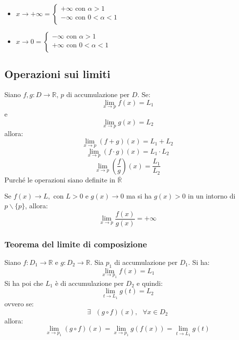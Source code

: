 \documentclass[a4paper,12pt, oneside]{book}
\begin{document}
\begin{shaded}
\begin{nota}
\begin{enumerate}
      \begin{itemize}
        \item $x\rightarrow +\infty=\left\{
          \begin{array}{ll} +\infty \mbox{ con } \alpha>1 \\ -\infty \mbox{ con
            } 0<\alpha<1 \\
          \end{array} \right.$
        \item $x\rightarrow 0=\left\{
          \begin{array}{ll} -\infty \mbox{ con } \alpha>1 \\ +\infty \mbox{ con
            } 0<\alpha<1 \\
          \end{array} \right.$
      \end{itemize}
    \end{enumerate}
  \end{nota}
\end{shaded}
\newpage
\subsection{Operazioni sui limiti}
\begin{teorema} Siano $f,g:D\rightarrow \mathbb{R}$,
  $p$ di accumulazione per $D$.  Se:
  $$\lim_{x\rightarrow p} f(x)=L_1$$
  e
  $$\lim_{x\rightarrow p} g(x)=L_2$$
  allora:
  $$\lim_{x\rightarrow p} (f+g)(x)=L_1+L_2$$
  $$\lim_{x\rightarrow p} (f\cdot g)(x)=L_1\cdot L_2$$
  $$\lim_{x\rightarrow p} \left(\frac{f}{g}\right)(x)=\frac{L_1}{L_2}$$
  Purché le operazioni siano definite in $\overline{\mathbb{R}}$
\end{teorema}
\begin{osservazione} Se $f(x)\rightarrow L, \mbox{ con } L>0$ e $
  g(x)\rightarrow 0$ ma si ha $g(x)>0$ in un intorno di $p\backslash\{p\}$,
  allora:
  $$\lim_{x\rightarrow p} \frac{f(x)}{g(x)}=+\infty$$
\end{osservazione}
\subsubsection{Teorema del limite di composizione}
\begin{teorema} Siano $f:D_1\rightarrow \mathbb{R}$
  e $g:D_2\rightarrow \mathbb{R}$. Sia $p_1$ di accumulazione per $D_1$. Si ha:
  $$\lim_{x\rightarrow p_1} f(x)=L_1$$
  Si ha poi che $L_1$ è di accumulazione per $D_2$ e quindi:
  $$\lim_{t\rightarrow L_1} g(t)=L_2$$
  ovvero se:
  $$\exists \mbox{ } (g\circ f)(x), \mbox{ } \forall x\in D_2$$
  allora:
  $$\lim_{x\rightarrow p_1}(g\circ f)(x)=\lim_{x\rightarrow p_1}g(f(x))=\lim_{t\rightarrow L_1}g(t)$$
\end{teorema}
\end{document}
